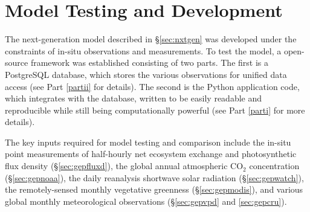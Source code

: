 \section{Model Testing and Development}
\label{sec:modeldev}
The next-generation model described in \S \ref{sec:nxtgen} was developed under the constraints of in-situ observations and measurements. 
To test the model, a open-source framework was established consisting of two parts.
The first is a PostgreSQL database, which stores the various observations for unified data access (see Part \ref{partii} for details).
The second is the Python application code, which integrates with the database, written to be easily readable and reproducible while still being computationally powerful (see Part \ref{parti} for more details).

The key inputs required for model testing and comparison include the in-situ point measurements of half-hourly net ecosystem exchange and photosynthetic flux density (\S \ref{sec:gepfluxd}), the global annual atmospheric CO$_2$ concentration (\S \ref{sec:gepnoaa}), the daily reanalysis shortwave solar radiation (\S \ref{sec:gepwatch}), the remotely-sensed monthly vegetative greenness (\S \ref{sec:gepmodis}), and various global monthly meteorological observations (\S \ref{sec:gepvpd} and \ref{sec:gepcru}).

